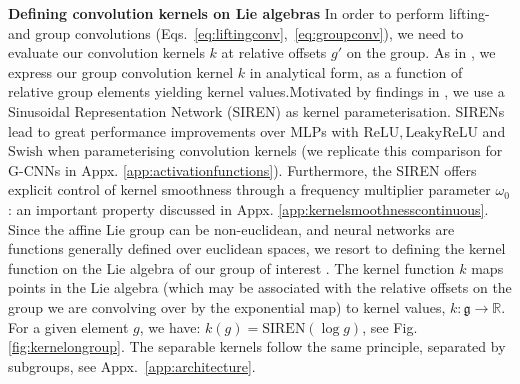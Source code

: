 \documentclass[nohyperref]{article}
\theoremstyle{plain}
\theoremstyle{definition}
\theoremstyle{remark}
\newcommand{\R}{\mathbb{R}}
\begin{document}
\textbf{Defining convolution kernels on Lie algebras} In order to perform lifting- and group convolutions (Eqs.~\ref{eq:liftingconv},~\ref{eq:groupconv}), we need to evaluate our convolution kernels $k$ at relative offsets $g'$ on the group. As in \citet{bekkers2017template,weiler2018learning,bekkers2019b, finzi2020generalizing}, we express our group convolution kernel $k$ in analytical form, as a function of relative group elements yielding kernel values.\break Motivated by findings in \citet{romero2021ckconv}, we use a Sinusoidal Representation Network (SIREN) \citep{sitzmann2020implicit} as kernel parameterisation. SIRENs lead to great performance improvements over MLPs with $\mathrm{ReLU}, \mathrm{LeakyReLU}$ and $\mathrm{Swish}$ when parameterising convolution kernels (we replicate this comparison for G-CNNs in Appx. \ref{app:activationfunctions}). Furthermore, the SIREN offers explicit control of kernel smoothness through a frequency multiplier parameter $\omega_0$: an important property discussed in Appx. \ref{app:kernelsmoothnesscontinuous}. Since the affine Lie group can be non-euclidean, and neural networks are functions generally defined over euclidean spaces, we resort to defining the kernel function on the Lie algebra of our group of interest \citep{bekkers2019b,finzi2020generalizing}. The kernel function $k$ maps points in the Lie algebra (which may be associated with the relative offsets on the group we are convolving over by the exponential map) to kernel values, $k:\mathfrak{g} \rightarrow \R$. For a given element $g$, we have: $k(g){=}\mathrm{SIREN}(\log g)$, see Fig. \ref{fig:kernelongroup}. The separable kernels follow the same principle, separated by subgroups, see Appx.~\ref{app:architecture}.
\end{document}
